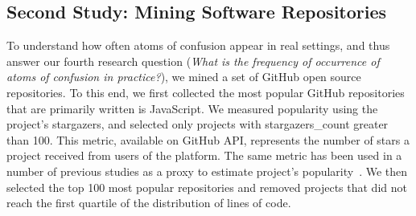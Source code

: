     
    
\subsection{Second Study: Mining Software Repositories}

To understand how often atoms of confusion appear in real settings, and thus answer our fourth research question (\emph{What is the frequency of occurrence of atoms of confusion in practice?}), we mined a set of GitHub open source repositories. To this end, we first collected the most popular GitHub repositories that are primarily written is JavaScript. We measured popularity using the project's stargazers, and selected only projects with stargazers\_count greater than 100. This metric, available on  GitHub API, represents the number of stars a project received from users of the platform. The same metric has been used in a number of previous studies as a proxy to estimate project's popularity~\cite{gyimesi2019bugsjs}. We then selected the top 100 most popular repositories and removed projects that did not reach the first quartile of the distribution of lines of code.


